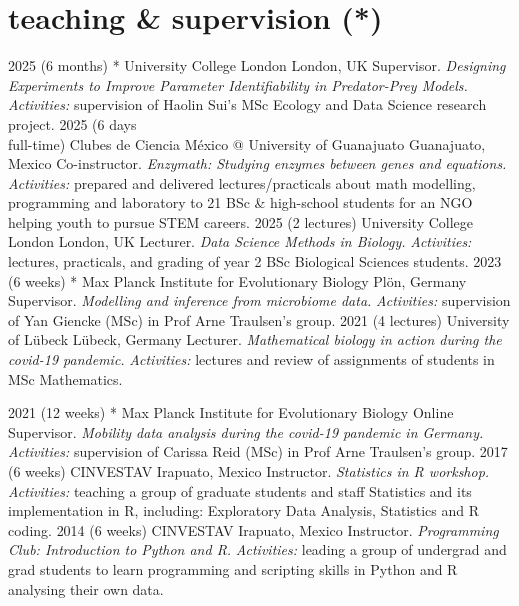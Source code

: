 \documentclass[]{friggeri-cv} %
\begin{document}
\section{teaching \& supervision (*)}

\begin{entrylist}
\entry
{2025}
{(6 months)}
{* University College London}
{London, UK}
{Supervisor. \emph{Designing Experiments to Improve Parameter Identifiability in Predator-Prey Models.}}
{\emph{Activities:} supervision of Haolin Sui's MSc Ecology and Data Science research project.
}
\entry
{2025}
{(6 days\\ full-time)}
{Clubes de Ciencia México @ University of Guanajuato}
{Guanajuato, Mexico}
{Co-instructor. \emph{Enzymath: Studying enzymes between genes and equations.}}
{\emph{Activities:} prepared and delivered lectures/practicals about math modelling, programming and laboratory to 21 BSc \& high-school students for an NGO helping youth to pursue STEM careers.
}
\entry
{2025}
{(2 lectures)}
{University College London}
{London, UK}
{Lecturer. \emph{Data Science Methods in Biology.}}
{\emph{Activities:} lectures, practicals, and grading of year 2 BSc Biological Sciences students.
}
\entry
{2023}
{(6 weeks)}
{* Max Planck Institute for Evolutionary Biology}
{Plön, Germany}
{Supervisor. \emph{Modelling and inference from microbiome data.}}
{\emph{Activities:} supervision of Yan Giencke (MSc) in Prof Arne Traulsen's group.
}
\entry
{2021}
{(4 lectures)}
{University of Lübeck}
{Lübeck, Germany}
{Lecturer. \emph{Mathematical biology in action during the covid-19 pandemic.}}
{\emph{Activities:} lectures and review of assignments of students in MSc Mathematics.
}
\end{entrylist}
\begin{entrylist}
\entry
{2021}
{(12 weeks)}
{* Max Planck Institute for Evolutionary Biology}
{Online}
{Supervisor. \emph{Mobility data analysis during the covid-19 pandemic in Germany.}}
{\emph{Activities:} supervision of Carissa Reid (MSc) in Prof Arne Traulsen's group.
}
\entry
{2017}
{(6 weeks)}
{CINVESTAV}
{Irapuato, Mexico}
{Instructor. \emph{Statistics in R workshop.}}
{\emph{Activities:} teaching a group of graduate students and staff Statistics and its implementation in R, including: Exploratory Data Analysis, Statistics and R coding.
}
\entry
{2014}
{(6 weeks)}
{CINVESTAV}
{Irapuato, Mexico}
{Instructor. \emph{Programming Club: Introduction to Python and R.}}
{\emph{Activities:} leading a group of undergrad and grad students to learn programming and scripting skills in Python and R analysing their own data.
}
\end{entrylist}
\end{document}
